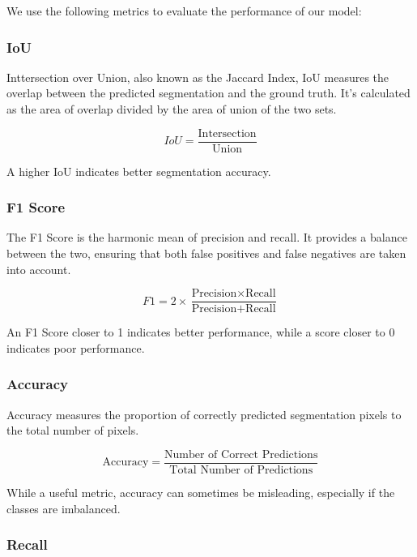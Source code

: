 \documentclass[11pt, a4paper,oneside,chapterprefix=false]{scrbook}
\begin{document}
We use the following metrics to evaluate the performance of our model:

\subsubsection{IoU}

Inttersection over Union, also known as the Jaccard Index, IoU measures the overlap between the predicted segmentation and the ground truth. It's calculated as the area of overlap divided by the area of union of the two sets.

\begin{equation}
	IoU = \frac{\text{Intersection}}{\text{Union}}
\end{equation}

A higher IoU indicates better segmentation accuracy.

\subsubsection{F1 Score}

The F1 Score is the harmonic mean of precision and recall. It provides a balance between the two, ensuring that both false positives and false negatives are taken into account.

\begin{equation}
	F1 = 2 \times \frac{\text{Precision} \times \text{Recall}}{\text{Precision} + \text{Recall}}
\end{equation}

An F1 Score closer to 1 indicates better performance, while a score closer to 0 indicates poor performance.

\subsubsection{Accuracy}

Accuracy measures the proportion of correctly predicted segmentation pixels to the total number of pixels.

\begin{equation}
	\text{Accuracy} = \frac{\text{Number of Correct Predictions}}{\text{Total Number of Predictions}}
\end{equation}

While a useful metric, accuracy can sometimes be misleading, especially if the classes are imbalanced.

\subsubsection{Recall}
\end{document}

